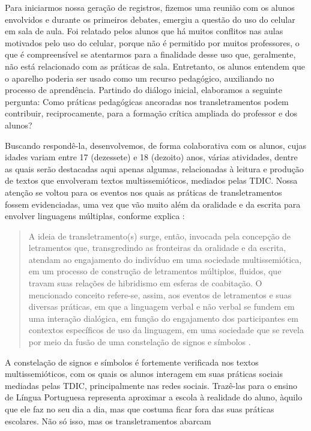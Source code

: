 \documentclass{textolivre}
\begin{document}
Para iniciarmos nossa geração de registros, fizemos uma reunião com os alunos envolvidos e durante os primeiros debates, emergiu a questão do uso do celular em sala de aula. Foi relatado pelos alunos que há muitos conflitos nas aulas motivados pelo uso do celular, porque não é permitido por muitos professores, o que é compreensível se atentarmos para a finalidade desse uso que, geralmente, não está relacionado com as práticas de sala. Entretanto, os alunos entendem que o aparelho poderia ser usado como um recurso pedagógico, auxiliando no processo de aprendência. Partindo do diálogo inicial, elaboramos a seguinte pergunta: Como práticas pedagógicas ancoradas nos transletramentos podem contribuir, reciprocamente, para a formação crítica ampliada do professor e dos alunos?

Buscando respondê-la, desenvolvemos, de forma colaborativa com os alunos, cujas idades variam entre 17 (dezessete) e 18 (dezoito) anos, várias atividades, dentre as quais serão destacadas aqui apenas algumas, relacionadas à leitura e produção de textos que envolveram textos multissemióticos, mediados pelas TDIC. Nossa atenção se voltou para os eventos nos quais as práticas de transletramentos fossem evidenciadas, uma vez que vão muito além da oralidade e da escrita para envolver linguagens múltiplas, conforme explica \textcite{rocha2008}:

\begin{quote}
A ideia de transletramento(s) surge, então, invocada pela concepção de letramentos que, transgredindo as fronteiras da oralidade e da escrita, atendam ao engajamento do indivíduo em uma sociedade multissemiótica, em um processo de construção de letramentos múltiplos, fluidos, que travam suas relações de hibridismo em esferas de coabitação. O mencionado conceito refere-se, assim, aos eventos de letramentos e suas diversas práticas, em que a linguagem verbal e não verbal se fundem em uma interação dialógica, em função do engajamento dos participantes em contextos específicos de uso da linguagem, em uma sociedade que se revela por meio da fusão de uma constelação de signos e símbolos \cite[p.~439]{rocha2008}.
\end{quote}

A constelação de signos e símbolos é fortemente verificada nos textos multissemióticos, com os quais os alunos interagem em suas práticas sociais mediadas pelas TDIC, principalmente nas redes sociais. Trazê-las para o ensino de Língua Portuguesa representa aproximar a escola à realidade do aluno, àquilo que ele faz no seu dia a dia, mas que costuma ficar fora das suas práticas escolares. Não só isso, mas os transletramentos abarcam
\end{document}
